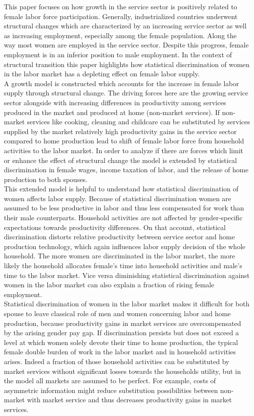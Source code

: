 \documentclass[a4paper,12pt]{article}
\begin{document}
This paper focuses on how growth in the service sector is positively related to female labor force participation. Generally, industrialized countries underwent structural changes which are characterized by an increasing service sector as well as increasing employment, especially among the female population. Along the way most women are employed in the service sector. Despite this progress, female employment is in an inferior position to male employment. In the context of structural transition this paper highlights how statistical discrimination of women in the labor market has a depleting effect on female labor supply.\\
A growth model is constructed which accounts for the increase in female labor supply through structural change. The driving forces here are the growing service sector alongside with increasing differences in productivity among services produced in the market and produced at home (non-market services). If non-market services like cooking, cleaning and childcare can be substituted by services supplied by the market relatively high productivity gains in the service sector compared to home production lead to shift of female labor force from household activities to the labor market. In order to analyze if there are forces which limit or enhance the effect of structural change the model is extended by statistical discrimination in female wages, income taxation of labor, and the release of home production to both spouses.\\
This extended model is helpful to understand how statistical discrimination of women affects labor supply. Because of statistical discrimination women are assumed to be less productive in labor and thus less compensated for work than their male counterparts. Household activities are not affected by gender-specific expectations towards productivity differences. On that account, statistical discrimination distorts relative productivity between service sector and home production technology, which again influences labor supply decision of the whole household. The more women are discriminated in the labor market, the more likely the household allocates female's time into household activities and male's time to the labor market. Vice versa diminishing statistical discrimination against women in the labor market can also explain a fraction of rising female employment.\\ 
Statistical discrimination of women in the labor market makes it difficult for both spouse to leave classical role of men and women concerning labor and home production, because productivity gains in market services are overcompensated by the arising gender pay gap. If discrimination persists but does not exceed a level at which women solely devote their time to home production, the typical female double burden of work in the labor market and in household activities arises. Indeed a fraction of those household activities can be substituted by market services without significant losses towards the households utility, but in the model all markets are assumed to be perfect. For example, costs of asymmetric information might reduce substitution possibilities between non-market with market service and thus decreases productivity gains in market services.\\
\end{document}
